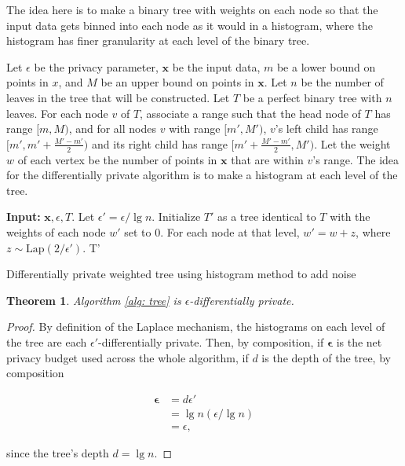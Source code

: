 \documentclass[11pt, oneside]{article}
\newtheorem{theorem}{Theorem}
\newcommand{\x}{\boldsymbol{x}}
\newcommand{\lap}{\text{Lap}}
\newcommand{\eps}{\epsilon}
\begin{document}
The idea here is to make a binary tree with weights on each node so that the input data gets binned into each node as it would in a histogram, where the histogram has finer granularity at each level of the binary tree. 

Let $\epsilon$ be the privacy parameter, $\x$ be the input data, $m$ be a lower bound on points in $x$, and $M$ be an upper bound on points in $\x$. Let $n$ be the number of leaves in the tree that will be constructed. Let $T$ be a perfect binary tree with $n$ leaves. For each node $v$ of $T$, associate a range such that the head node of $T$ has range $[m,M)$, and for all nodes $v$ with range $[m', M')$, $v$'s left child has range $[m', m' + \frac{M'-m'}{2})$ and its right child has range $[m' + \frac{M'-m'}{2}, M')$. Let the weight $w$ of each vertex be the number of points in $\x$ that are within $v$'s range. The idea for the differentially private algorithm is to make a histogram at each level of the tree. 
\begin{algorithm}
\begin{algorithmic}
\STATE \textbf{Input:} $\x, \eps, T$.
\STATE Let $\eps' = \eps / \lg n$. 
\STATE Initialize $T'$ as a tree identical to $T$ with the weights of each node $w'$ set to 0.
	\STATE For each node at that level, $w' = w + z$, where $z \sim \lap(2/\eps')$.
\ENDFOR
\RETURN T'
\end{algorithmic}
\caption{Differentially private weighted tree using histogram method to add noise}
\label{alg: tree}
\end{algorithm}

\begin{theorem}
Algorithm \ref{alg: tree} is $\eps$-differentially private.
\end{theorem}

\begin{proof}
By definition of the Laplace mechanism, the histograms on each level of the tree are each $\eps'$-differentially private. Then, by composition, if $\boldsymbol{\eps}$ is the net privacy budget used across the whole algorithm, if $d$ is the depth of the tree, by composition

\begin{align*}
\boldsymbol{\eps} &= d \eps' \\
	&= \lg n (\eps/\lg n) \\
	&= \eps,
\end{align*}

since the tree's depth $d = \lg n$.
\end{proof}
\end{document}
